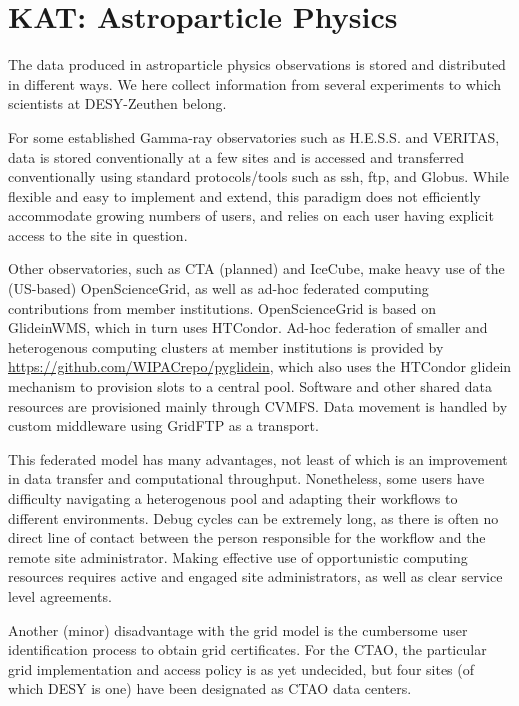 \section{KAT: Astroparticle Physics} 



The data produced in astroparticle physics observations is stored and 
distributed in different ways. We here collect information from several 
experiments to which scientists at DESY-Zeuthen belong. 

For some established Gamma-ray observatories such as H.E.S.S. and
VERITAS, data is stored conventionally at a few sites and is accessed
and transferred conventionally using standard protocols/tools such as
ssh, ftp, and Globus. While flexible and easy to implement and extend,
this paradigm does not efficiently accommodate growing numbers of users,
and relies on each user having explicit access to the site in question. 

Other observatories, such as CTA (planned) and IceCube, make heavy use
of the (US-based) OpenScienceGrid, as well as ad-hoc federated computing
contributions from member institutions. OpenScienceGrid is based on
GlideinWMS, which in turn uses HTCondor. Ad-hoc federation of smaller
and heterogenous computing clusters at member institutions is provided
by \url{https://github.com/WIPACrepo/pyglidein}, which also uses the
HTCondor glidein mechanism to provision slots to a central pool.
Software and other shared data resources are provisioned mainly through
CVMFS. Data movement is handled by custom middleware using GridFTP as a
transport.

This federated model has many advantages, not least of which is an
improvement in data transfer and computational throughput. Nonetheless,
some users have difficulty navigating a heterogenous pool and adapting
their workflows to different environments. Debug cycles can be extremely
long, as there is often no direct line of contact between the person
responsible for the workflow and the remote site administrator. Making
effective use of opportunistic computing resources requires active and
engaged site administrators, as well as clear service level agreements.

Another (minor) disadvantage with the grid model is the cumbersome user
identification process to obtain grid certificates. For the CTAO, the
particular grid implementation and access policy is as yet undecided, but
four sites (of which DESY is one) have been designated as CTAO data
centers. 
